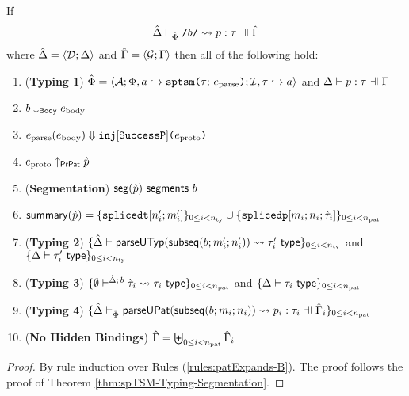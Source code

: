 \begin{theorem}
\label{thm:spTSM-Typing-Segmentation-Implicit-B}
If \[\patExpands{\upctx}{\uPhi}{\lit{b}}{p}{\tau}\] where $\hat{\Delta}=\langle \mathcal{D}; \Delta \rangle$ and $\hat{\Gamma}=\langle \mathcal{G}; \Gamma \rangle$ then all of the following hold:
\begin{enumerate}
        \item (\textbf{Typing 1}) $\hat\Phi = \langle \mathcal{A}; \Phi, a \hookrightarrow \texttt{sptsm}\texttt{(}\tau;\,e_\text{parse}\texttt{)}; \mathcal{I}, \tau \hookrightarrow a \rangle$ and $\patType{\pctx}{p}{\tau}$
        \item $b \downarrow_\mathsf{Body} e_\text{body}$
        \item $e_\text{parse}(e_\text{body}) \Downarrow \texttt{inj}[\mathtt{SuccessP}]\texttt{(}e_\text{proto}\texttt{)}$
        \item $e_\text{proto} \uparrow_\mathsf{PrPat} \grave{p}$
        \item (\textbf{Segmentation}) $\mathsf{seg}(\grave{p})~\mathsf{segments}~b$
        \item $\mathsf{summary}(\grave{p}) = \{\texttt{splicedt}[n'_i; m'_i]\}_{0 \leq i < n_\text{ty}} \cup \{\texttt{splicedp}[m_i; n_i; \grave{\tau}_i]\}_{0 \leq i < n_\text{pat}}$
        \item (\textbf{Typing 2}) $\{
              \hat{\Delta} \vdash 
                \mathsf{parseUTyp}(\mathsf{subseq}(b; m'_i; n'_i))
               \leadsto \tau'_i~\mathsf{type}
            \}_{0 \leq i < n_\text{ty}}$ and $\{\Delta \vdash \tau'_i~\mathsf{type}\}_{0 \leq i < n_\text{ty}}$
        \item (\textbf{Typing 3}) $\{
          \emptyset\vdash^{
            \hat{\Delta};\,b
          } 
            \grave{\tau}_i
           \leadsto \tau_i~\mathsf{type}
        \}_{0 \leq i < n_\text{pat}}$ and $\{\Delta \vdash \tau_i~\mathsf{type}\}_{0 \leq i < n_\text{pat}}$
        \item (\textbf{Typing 4}) $\sseq{
          \patExpands
            {\upctx_i}
            {\uPhi}
            {\parseUPatF{\bsubseq{b}{m_i}{n_i}}}
            {p_i}
            {\tau_i}
        }{\npat}$ 
      \item (\textbf{No Hidden Bindings}) $\hat\Gamma = \biguplus_{0 \leq i < n_\text{pat}} \hat\Gamma_i$
\end{enumerate}
\end{theorem}
\begin{proof} By rule induction over Rules (\ref{rules:patExpands-B}). The proof follows the proof of Theorem \ref{thm:spTSM-Typing-Segmentation}. 
\end{proof}


